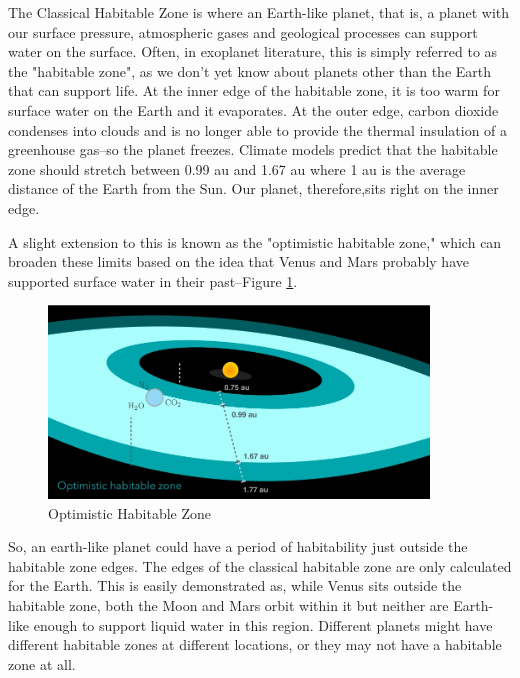\documentclass[]{article}
\begin{document}
The Classical Habitable Zone is where an Earth-like planet, that is, a planet with our surface pressure, atmospheric gases and geological processes can support water on the surface.
Often, in exoplanet literature, this is simply referred to as the "habitable zone", as we don't yet know about planets other than the Earth that can support life.
At the inner edge of the habitable zone, it is too warm for surface water on the Earth and it evaporates.
At the outer edge, carbon dioxide condenses into clouds and is no longer able to provide
the thermal insulation of a greenhouse gas--so the planet freezes.
Climate models predict that the habitable zone should stretch between 0.99 au and 1.67 au
where 1 au is the average distance of the Earth from the Sun.
Our planet, therefore,sits right on the inner edge.

A slight extension to this is known as the "optimistic habitable zone," which can broaden these limits based on the idea that Venus and Mars probably have
supported surface water in their past--Figure \ref{fig:optimistic:habitable:zone}.

\begin{figure}[H]
	\caption[Optimistic Habitable Zone]{Optimistic Habitable Zone\cite{kasting1993habitable,kopparapu2013habitable}}\label{fig:optimistic:habitable:zone}
	\includegraphics[width=0.9\textwidth]{OptimisticHabitableZone.jpg}
\end{figure}

So, an earth-like planet could have a period of habitability just outside the habitable zone edges.
The edges of the classical habitable zone are only calculated for the Earth.
This is easily demonstrated as, while Venus sits outside the habitable zone, both the Moon and Mars orbit within it but neither are Earth-like enough to support liquid water in this region.
Different planets might have different habitable zones at different locations, or they may not have a habitable zone at all.
\end{document}
